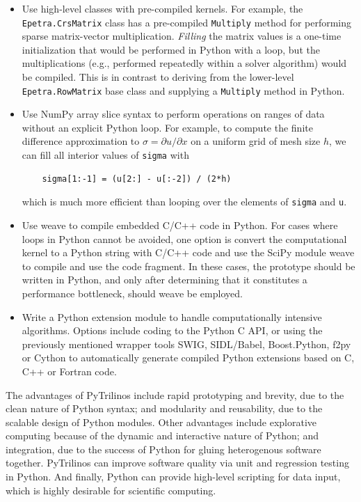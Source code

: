 \documentclass[11pt]{article}
\begin{document}
\begin{itemize}

\item Use high-level classes with pre-compiled kernels.  For example, the {\tt Epetra.CrsMatrix} class has a pre-compiled {\tt Multiply} method for performing sparse matrix-vector multiplication.  {\em Filling} the matrix values is a one-time initialization that would be performed in Python with a loop, but the multiplications (e.g., performed repeatedly within a solver algorithm) would be compiled.  This is in contrast to deriving from the lower-level {\tt Epetra.RowMatrix} base class and supplying a {\tt Multiply} method in Python.

\item Use NumPy array slice syntax to perform operations on ranges of data without an explicit Python loop.  For example, to compute the finite difference approximation to $\sigma = \partial u/\partial x$ on a uniform grid of mesh size $h$, we can fill all interior values of {\tt sigma} with

\begin{verbatim}
    sigma[1:-1] = (u[2:] - u[:-2]) / (2*h)
\end{verbatim}

which is much more efficient than looping over the elements of {\tt sigma} and {\tt u}.

\item Use weave to compile embedded C/C++ code in Python.  For cases where loops in Python cannot be avoided, one option is convert the computational kernel to a Python string with C/C++ code and use the SciPy module weave to compile and use the code fragment.  In these cases, the prototype should be written in Python, and only after determining  that it constitutes a performance bottleneck, should weave be employed.

\item Write a Python extension module to handle computationally intensive algorithms.  Options include coding to the Python C API, or using the previously mentioned wrapper tools SWIG, SIDL/Babel, Boost.Python, f2py or Cython to automatically generate compiled Python extensions based on C, C++ or Fortran code. 
\end{itemize}

The advantages of PyTrilinos include rapid prototyping and brevity, due to the clean nature of Python syntax; and modularity and reusability, due to the scalable design of Python modules.  Other advantages include explorative computing because of the dynamic and interactive nature of Python; and integration, due to the success of Python for gluing heterogenous software together.  PyTrilinos can improve software quality via unit and regression testing in Python.  And finally, Python can provide high-level scripting for data input, which is highly desirable for scientific computing.
\end{document}
